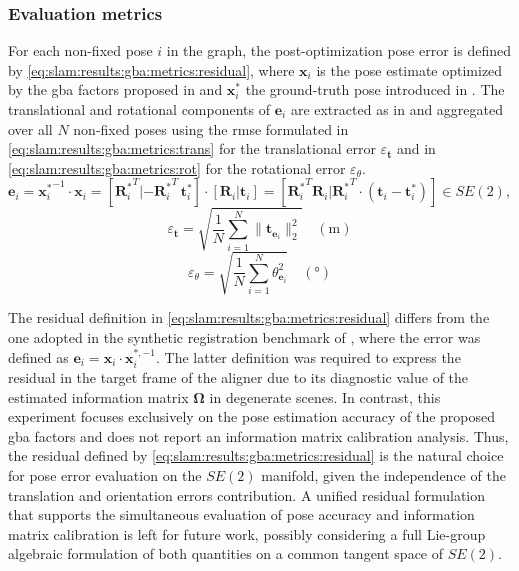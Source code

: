 \subsubsection{Evaluation metrics}
\label{sec:slam:results:gba:metrics}

For each non-fixed pose $i$ in the graph, the post-optimization pose error
is defined by \eqref{eq:slam:results:gba:metrics:residual},
where $\mathbf{x}_i$ is the pose estimate optimized by the \gls{gba} factors
proposed in  and $\mathbf{x}_i^*$ the ground-truth pose
introduced in .
The translational and rotational components of $\mathbf{e}_i$ are
extracted as in  and aggregated over
all $N$ non-fixed poses using the \gls{rmse} formulated in
\eqref{eq:slam:results:gba:metrics:trans} for the translational error
$\varepsilon_{\mathbf{t}}$ and in
\eqref{eq:slam:results:gba:metrics:rot} for the rotational error
$\varepsilon_{\theta}$.
\begin{equation}
\label{eq:slam:results:gba:metrics:residual}
\mathbf{e}_i = {\mathbf{x}_i^{*}}^{-1}\cdot\mathbf{x}_i =
\left[ {\mathbf{R}_i^{*}}^T | -{\mathbf{R}_i^{*}}^T  \, \mathbf{t}_i^{*} \right]
\cdot \left[ \mathbf{R}_i | \mathbf{t}_i \right] =
\left[ {\mathbf{R}_i^{*}}^T \mathbf{R}_i |
       {\mathbf{R}_i^{*}}^T \cdot \left( \mathbf{t}_i - \mathbf{t}_i^{*} \right) \right] \in SE(2),
\end{equation}
\begin{equation}
\label{eq:slam:results:gba:metrics:trans}
\varepsilon_{\mathbf{t}} =
\sqrt{\frac{1}{N}\sum_{i=1}^{N}\|\mathbf{t}_{\mathbf{e}_i}\|_2^2}
\quad(\si{\metre})
\end{equation}
\begin{equation}
\label{eq:slam:results:gba:metrics:rot}
\varepsilon_{\theta} =
\sqrt{\frac{1}{N}\sum_{i=1}^{N}\theta_{\mathbf{e}_i}^2}
\quad(\si{\degree})
\end{equation}

The residual definition in \eqref{eq:slam:results:gba:metrics:residual} differs
from the one adopted in the synthetic registration benchmark of
, where the error was defined as
$\mathbf{e}_i = \mathbf{x}_i\cdot\mathbf{x}_i^{*,-1}$. The latter definition was
required to express the residual in the target frame of the aligner due to its
diagnostic value of the estimated information matrix $\boldsymbol{\Omega}$ in
degenerate scenes. In contrast, this experiment focuses exclusively on the pose
estimation accuracy of the proposed \gls{gba} factors and does not report an
information matrix calibration analysis.
Thus, the residual defined by \eqref{eq:slam:results:gba:metrics:residual}
is the natural choice for pose error evaluation on the $SE(2)$ manifold,
given the independence of the translation and orientation errors contribution.
A unified residual formulation that supports the simultaneous evaluation of
pose accuracy and information matrix calibration is left for future work,
possibly considering a full Lie-group algebraic formulation of both quantities
on a common tangent space of $SE(2)$.


